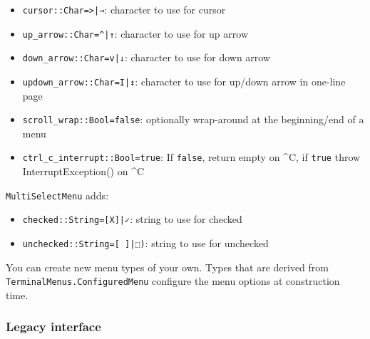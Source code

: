 \begin{itemize}
\item \texttt{cursor::Char={\textquotesingle}>{\textquotesingle}|{\textquotesingle}→{\textquotesingle}}: character to use for cursor


\item \texttt{up\_arrow::Char={\textquotesingle}{\textasciicircum}{\textquotesingle}|{\textquotesingle}↑{\textquotesingle}}: character to use for up arrow


\item \texttt{down\_arrow::Char={\textquotesingle}v{\textquotesingle}|{\textquotesingle}↓{\textquotesingle}}: character to use for down arrow


\item \texttt{updown\_arrow::Char={\textquotesingle}I{\textquotesingle}|{\textquotesingle}↕{\textquotesingle}}: character to use for up/down arrow in one-line page


\item \texttt{scroll\_wrap::Bool=false}: optionally wrap-around at the beginning/end of a menu


\item \texttt{ctrl\_c\_interrupt::Bool=true}: If \texttt{false}, return empty on {\textasciicircum}C, if \texttt{true} throw InterruptException() on {\textasciicircum}C

\end{itemize}


\texttt{MultiSelectMenu} adds:



\begin{itemize}
\item \texttt{checked::String={\textquotedbl}[X]{\textquotedbl}|{\textquotedbl}✓{\textquotedbl}}: string to use for checked


\item \texttt{unchecked::String={\textquotedbl}[ ]{\textquotedbl}|{\textquotedbl}⬚{\textquotedbl})}: string to use for unchecked

\end{itemize}


You can create new menu types of your own. Types that are derived from \texttt{TerminalMenus.ConfiguredMenu} configure the menu options at construction time.



\hypertarget{5762896069778058172}{}


\subsubsection{Legacy interface}



